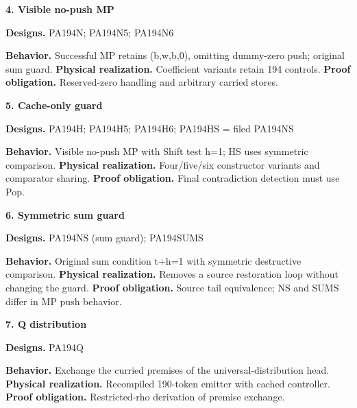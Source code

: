 \documentclass[10pt,a4paper]{article}
\begin{document}
\par\medskip\begin{samepage}\noindent\textbf{4. Visible no-push MP}\par\nobreak
\textbf{Designs.} PA194\allowbreak{}N;\allowbreak{} PA194\allowbreak{}N5;\allowbreak{} PA194\allowbreak{}N6

\textbf{Behavior.} Successful MP retains (b,\allowbreak{}w,\allowbreak{}b,\allowbreak{}0), omitting dummy-zero push; original sum guard. \textbf{Physical realization.} Coefficient variants retain 194 controls. \textbf{Proof obligation.} Reserved-zero handling and arbitrary carried stores.
\end{samepage}

\par\medskip\begin{samepage}\noindent\textbf{5. Cache-only guard}\par\nobreak
\textbf{Designs.} PA194\allowbreak{}H;\allowbreak{} PA194\allowbreak{}H5;\allowbreak{} PA194\allowbreak{}H6;\allowbreak{} PA194\allowbreak{}HS = filed PA194\allowbreak{}NS

\textbf{Behavior.} Visible no-push MP with Shift test h=1; HS uses symmetric comparison. \textbf{Physical realization.} Four/five/six constructor variants and comparator sharing. \textbf{Proof obligation.} Final contradiction detection must use Pop.
\end{samepage}

\par\medskip\begin{samepage}\noindent\textbf{6. Symmetric sum guard}\par\nobreak
\textbf{Designs.} PA194\allowbreak{}NS (sum guard);\allowbreak{} PA194\allowbreak{}SUMS

\textbf{Behavior.} Original sum condition t+h=1 with symmetric destructive comparison. \textbf{Physical realization.} Removes a source restoration loop without changing the guard. \textbf{Proof obligation.} Source tail equivalence; NS and SUMS differ in MP push behavior.
\end{samepage}

\par\medskip\begin{samepage}\noindent\textbf{7. Q distribution}\par\nobreak
\textbf{Designs.} PA194\allowbreak{}Q

\textbf{Behavior.} Exchange the curried premises of the universal-distribution head. \textbf{Physical realization.} Recompiled 190-token emitter with cached controller. \textbf{Proof obligation.} Restricted-rho derivation of premise exchange.
\end{samepage}
\end{document}
